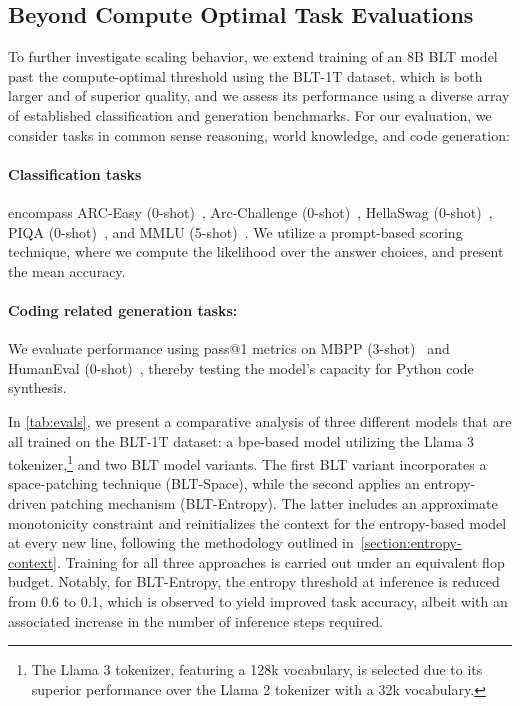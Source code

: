 \subsection{Beyond Compute Optimal Task Evaluations}
\label{section:evals}
To further investigate scaling behavior, we extend training of an 8B {\textsc BLT} model past the compute-optimal threshold using the {\textsc BLT}-1T dataset, which is both larger and of superior quality, and we assess its performance using a diverse array of established classification and generation benchmarks. For our evaluation, we consider tasks in common sense reasoning, world knowledge, and code generation:
\paragraph{Classification tasks} encompass ARC-Easy (0-shot)~\citep{Eval_ARC}, Arc-Challenge (0-shot)~\citep{Eval_ARC}, HellaSwag (0-shot)~\citep{Eval_hellaswag}, PIQA (0-shot)~\citep{Eval_piqa}, and MMLU (5-shot)~\citep{hendrycks2020measuring}. We utilize a prompt-based scoring technique, where we compute the likelihood over the answer choices, and present the mean accuracy.
\paragraph{Coding related generation tasks:} We evaluate performance using pass@1 metrics on MBPP (3-shot)~\citep{Eval_MBPP} and HumanEval (0-shot)~\citep{Eval_HumanEval}, thereby testing the model’s capacity for Python code synthesis.

In \autoref{tab:evals}, we present a comparative analysis of three different models that are all trained on the {\textsc BLT}-1T dataset: a bpe-based model utilizing the Llama 3 tokenizer,\footnote{The Llama 3 tokenizer, featuring a 128k vocabulary, is selected due to its superior performance over the Llama 2 tokenizer with a 32k vocabulary.} and two {\textsc BLT} model variants. The first {\textsc BLT} variant incorporates a space-patching technique ({\textsc BLT}-Space), while the second applies an entropy-driven patching mechanism ({\textsc BLT}-Entropy). The latter includes an approximate monotonicity constraint and reinitializes the context for the entropy-based model at every new line, following the methodology outlined in~\autoref{section:entropy-context}. Training for all three approaches is carried out under an equivalent flop budget. Notably, for {\textsc BLT}-Entropy, the entropy threshold at inference is reduced from 0.6 to 0.1, which is observed to yield improved task accuracy, albeit with an associated increase in the number of inference steps required.

